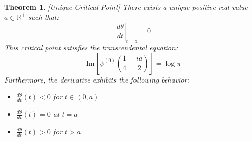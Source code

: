 \documentclass{article}
\newtheorem{theorem}{Theorem}
\begin{document}
\begin{theorem}
  \label{ucp}[Unique Critical Point] There exists a unique positive real value
  $a \in \mathbb{R}^+$ such that:
  \begin{equation}
    \left. \frac{d \theta}{dt} \right|_{t = a} = 0
  \end{equation}
  This critical point satisfies the transcendental equation:
  \begin{equation}
    \text{Im} \left[ \psi^{(0)}  \left( \frac{1}{4} + \frac{ia}{2} \right)
    \right] = \log \pi
  \end{equation}
  Furthermore, the derivative exhibits the following behavior:
  \begin{itemize}
    \item $\frac{d \theta}{dt} (t) < 0$ for $t \in (0, a)$
    
    \item $\frac{d \theta}{dt} (t) = 0$ at $t = a$
    
    \item $\frac{d \theta}{dt} (t) > 0$ for $t > a$
  \end{itemize}
\end{theorem}
\end{document}

